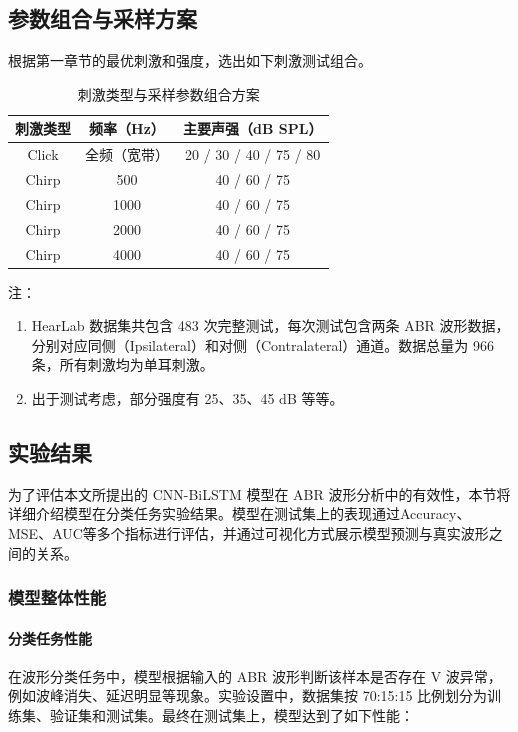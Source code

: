 \subsection*{参数组合与采样方案}
根据第一章节的最优刺激和强度，选出如下刺激测试组合。
\begin{table}[H]
\centering
\setlength{\abovecaptionskip}{0pt}  %
\setlength{\belowcaptionskip}{5pt}  %
\caption{刺激类型与采样参数组合方案}
\label{tab:stimulus-combinations}
\begin{tabular}{|c|c|c|}
\hline
\textbf{刺激类型} & \textbf{频率（Hz）} & \textbf{主要声强（dB SPL）} \\
\hline
Click & 全频（宽带） &  20 / 30 / 40 / 75 / 80 \\
\hline
Chirp & 500 & 40 / 60 / 75 \\
\hline
Chirp & 1000 & 40 / 60 / 75 \\
\hline
Chirp & 2000 & 40 / 60 / 75 \\
\hline
Chirp & 4000 & 40 / 60 / 75 \\
\hline
\end{tabular}
\end{table}

\noindent \footnotesize 注：\\
\begin{enumerate}
\item HearLab 数据集共包含 483 次完整测试，每次测试包含两条 ABR 波形数据，分别对应同侧（Ipsilateral）和对侧（Contralateral）通道。数据总量为 966 条，所有刺激均为单耳刺激。
\item 出于测试考虑，部分强度有 25、35、45 dB 等等。
\end{enumerate}
\normalsize 


\subsection*{实验结果}
为了评估本文所提出的 CNN-BiLSTM 模型在 ABR 波形分析中的有效性，本节将详细介绍模型在分类任务实验结果。模型在测试集上的表现通过Accuracy、MSE、AUC等多个指标进行评估，并通过可视化方式展示模型预测与真实波形之间的关系。
\subsubsection*{模型整体性能}
\paragraph*{分类任务性能}
在波形分类任务中，模型根据输入的 ABR 波形判断该样本是否存在 V 波异常，例如波峰消失、延迟明显等现象。实验设置中，数据集按 70:15:15 比例划分为训练集、验证集和测试集。最终在测试集上，模型达到了如下性能：

